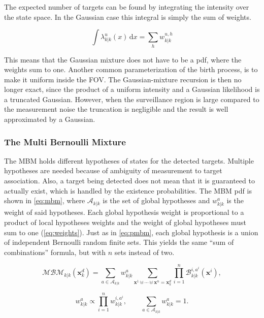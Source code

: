 The expected number of targets can be found by integrating the intensity over the state space. In the Gaussian case this integral is simply the sum of weights.

\begin{equation*}
    \int \lambda^u_{k|k}(x)\,\mathrm{d}x = \sum_{h} w^{u,h}_{k|k}
\end{equation*}

This means that the Gaussian mixture does not have to be a pdf, where the weights sum to one. Another common parameterization of the birth process, is to make it uniform inside the FOV. The Gaussian-mixture recursion is then no longer exact, since the product of a uniform intensity and a Gaussian likelihood is a truncated Gaussian. However, when the surveillance region is large compared to the measurement noise the truncation is negligible and the result is well approximated by a Gaussian.
\medskip

\subsubsection{The Multi Bernoulli Mixture}
The MBM holds different hypotheses of states for the detected targets. Multiple hypotheses are needed because of ambiguity of measurement to target association. Also, a target being detected does not mean that it is guaranteed to actually exist, which is handled by the existence probabilities. The MBM pdf is shown in \autoref{eq:mbm}, where $\mathcal{A}_{k|k}$ is the set of global hypotheses and $w^{a}_{k|k}$ is the weight of said hypotheses. Each global hypothesis weight is proportional to a product of local hypotheses weights and the weight of global hypotheses must sum to one (\autoref{eq:weights}). Just as in \autoref{eq:pmbm}, each global hypothesis is a union of independent Bernoulli random finite sets. This yields the same ``sum of combinations'' formula, but with $n$ sets instead of two.

\begin{equation}
  \mathcal{MBM}_{k|k}(\mathbf{x}^d_k) = \sum_{a \in \mathcal{A}_{k|k}} w^{a}_{k|k} \sum_{\mathbf{x}^1 \uplus \cdots \uplus \mathbf{x}^{n} = \mathbf{x}^d_k} \prod_{i=1}^{n} \mathcal{B}^{i,a^i}_{k|k}(\mathbf{x}^i), 
  \label{eq:mbm}
\end{equation}

\begin{equation}
  w^{a}_{k|k} \propto \prod_{i=1}^{n} w^{i,a^i}_{k|k},
  \qquad
  \sum_{a \in \mathcal{A}_{k|k}} w^{a}_{k|k} = 1.
  \label{eq:weights}
\end{equation}

